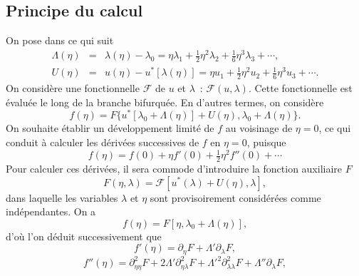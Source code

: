 \documentclass{article}
\newcommand{\nocomma}{}
\begin{document}
\subsection{Principe du calcul}\label{sec20220107121442}

On pose dans ce qui suit
\begin{eqnarray}
  \Lambda (\eta) & = & \lambda (\eta) - \lambda_0 = \eta \lambda_1 +
  \tfrac{1}{2} \eta^2 \lambda_2 + \tfrac{1}{6} \eta^3 \lambda_3 + \cdots,
  \label{eq20211112155446}\\
  U (\eta) & = & u (\eta) - u^{\ast} [\lambda (\eta)] = \eta u_1 +
  \tfrac{1}{2} \eta^2 u_2 + \tfrac{1}{6} \eta^3 u_3 + \cdots .
  \label{eq20211112113028}
\end{eqnarray}
On considère une fonctionnelle $\mathcal{F}$ de $u$ et $\lambda$~:
$\mathcal{F} (u, \lambda)$. Cette fonctionnelle est évaluée le long de
la branche bifurquée. En d'autres termes, on considère
\begin{equation}
  f (\eta) = F \{ u^{\ast} [\lambda_0 + \Lambda (\eta)] + U (\eta), \lambda_0
  + \Lambda (\eta) \} .
\end{equation}
On souhaite établir un développement limité de $f$ au voisinage de
$\eta = 0$, ce qui conduit à calculer les dérivées successives de
$f$ en $\eta = 0$, puisque
\begin{equation}
  f (\eta) = f (0) + \eta f' (0) + \tfrac{1}{2} \eta^2 f'' (0) + \cdots
\end{equation}
Pour calculer ces dérivées, il sera commode d'introduire la fonction
auxiliaire $F$
\begin{equation}
  F (\eta, \lambda) =\mathcal{F} [u^{\ast} (\lambda) + U (\eta), \lambda],
\end{equation}
dans laquelle les variables $\lambda$ et $\eta$ sont provisoirement
considérées comme indépendantes. On a
\begin{equation}
  f (\eta) = F [\eta, \lambda_0 + \Lambda (\eta)],
\end{equation}
d'où l'on déduit successivement que
\begin{equation}
  \label{eq20211112162417} f' (\eta) = \partial_{\eta} F + \Lambda'
  \partial_{\lambda} F,
\end{equation}
\begin{equation}
  \label{eq20211112165810} f'' (\eta) = \partial_{\eta \nocomma \eta}^2 F + 2
  \Lambda' \partial_{\eta \nocomma \lambda}^2 {F + \Lambda'}^2
  \partial_{\lambda \nocomma \lambda}^2 F + \Lambda'' \partial_{\lambda} F,
\end{equation}
\end{document}
